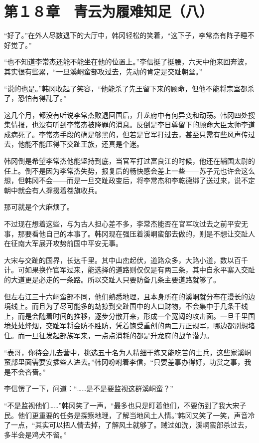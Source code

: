 \section{第１８章　青云为履难知足（八）}

“好了。”在外人尽数退下的大厅中，韩冈轻松的笑着，“这下子，李常杰有阵子睡不好觉了。”

“也不知道李常杰还能不能坐在他的位置上。”李信挺了挺腰，六天中他来回奔波，其实很有些累，“一旦溪峒蛮部攻过去，先动的肯定是交趾朝堂。”

“说的也是。”韩冈收起了笑容，“他能杀了先王留下来的顾命，但他不能将宗室都杀了，恐怕有得乱了。”

这几个月，都没有听说李常杰败退回国后，升龙府中有何异变和动荡。韩冈四处搜集情报，也没有听到李常杰被降罪的消息。反倒是李日尊留下的顾命大臣太师李道成病死了。李常杰手段的确是够黑的，但若是官军打过去，甚至只需有些风声传过去，他能不能压得下交趾王族，还真是个迷。

韩冈倒是希望李常杰他能坚持到底，当官军打过富良江的时候，他还在辅国太尉的任上。倒不是因为李常杰失势，报复后的畅快感会差上一些——苏子元也许会这么想，但韩冈不会——而是一旦交趾政变后，将李常杰和李乾德绑了送过来，说不定朝中就会有人撺掇着卷旗收兵。

那可就是个大麻烦了。

不过现在想着这些，与为古人担心差不多，李常杰能否在官军攻过去之前平安无事，那要看他自己的本事了。韩冈现在强压着溪峒蛮部去做的，则是不想让交趾人在征南大军展开攻势前国中平安无事。

大宋与交趾的国界，长达千里。其中山峦起伏，道路众多，大路小道，数以百千计。可如果换作官军过来，能选择的道路则仅仅是有两三条，其中自永平寨入交趾的大道更是必走的一条路。所以交趾人只要防备几条主要道路就够了。

但左右江三十六峒蛮部不同，他们熟悉地理，且本身所在的溪峒就分布在漫长的边境线上。而且为了尽可能多的劫掠到交趾国中的人口财物，不会集中于几条干线上，而是会随着时间的推移，逐步分散开来，形成一个宽阔的攻击面。一旦千里国境处处烽烟，交趾军将会防不胜防，凭着饱受重创的两三万正规军，哪边都别想堵住。而一旦征发起部族军来，一点点消耗的都是升龙府的战争潜力。

“表哥，你待会儿去营中，挑选五十名为人精细干练又能吃苦的士兵，这些家溪峒蛮部里面需要安插些人进去。”韩冈吩咐着李信，“只要差事办得好，功赏之事，我是不会吝啬。”

李信愣了一下，问道：“……是不是要监视这群溪峒蛮？”

“不是监视他们……”韩冈笑了一声，“最多也只是盯着他们，不要伤到了我大宋子民。他们更重要的任务是探察地理，了解当地风土人情。”韩冈又笑了一笑，声音冷了一点，“其实可以把人情去掉，了解风土就够了。贼过如洗，溪峒蛮部杀过去，多半会是鸡犬不留。”

